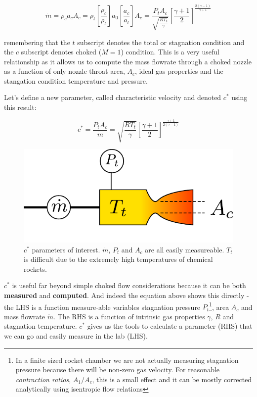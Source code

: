 \documentclass[twocolumn]{memoir} %
\begin{document}
\begin{equation}\dot{m} = \rho_c a_c A_c  = \rho_t \left[ \frac{\rho_c}{\rho_t}\right]a_0 \left[ \frac{a_c}{a_t}\right]A_c = \frac{P_t A_c}{\sqrt{\frac{R T_t}{\gamma}}} \left[\frac{\gamma + 1}{2}\right]^{\frac{2(\gamma-1)}{\gamma+1}}
\end{equation}

remembering that the $t$ subscript denotes the total or stagnation
condition and the $c$ subscript denotes choked ($M=1$) condition.
This is a very useful relationship as it allows us to compute the mass
flowrate through a choked nozzle as a function of only nozzle throat
area, $A_c$, ideal gas properties and the stangation condition
temperature and pressure.

Let's define a new parameter, called characteristic velocity and denoted
$c^{*}$ using this result:

\begin{equation}c^* = \frac{P_t A_c}{\dot{m}} = \sqrt{\frac{R T_t}{\gamma}}\left[\frac{\gamma + 1}{2}\right]^{\frac{\gamma + 1}{2(\gamma - 1)}}
\end{equation}

\begin{figure}[H]
    \includegraphics[width=0.9\columnwidth]{cstar_diagram}
    \caption{$c^*$ parameters of interest.  $\dot{m}$, $P_t$ and $A_c$ are all easily 
    measureable.  $T_t$ is difficult due to the extremely high temperatures of chemical
    rockets.}
\end{figure}

$c^*$ is useful far beyond simple choked flow considerations because
it can be both \textbf{measured} and \textbf{computed}. And indeed the
equation above shows this directly - the LHS is a function 
measure-able variables stagnation pressure $P_t$\footnote{In a finite sized rocket chamber we are not actually measuring stagnation pressure because there will be non-zero gas velocity.  For reasonable \emph{contraction ratios}, $A_1/A_c$, this is a small effect and it can be mostly corrected analytically using isentropic flow relations}, area $A_c$ and mass flowrate $\dot{m}$. The RHS is a
function of intrinsic gas properties $\gamma$, $R$ and stagnation
temperature. $c^*$ gives us the tools to calculate a parameter (RHS)
that we can go and easily measure in the lab (LHS).
\end{document}

